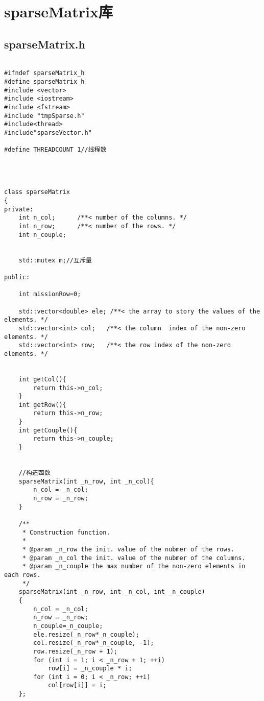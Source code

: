 \chapter{sparseMatrix库}

\section{sparseMatrix.h}
\begin{lstlisting}

#ifndef sparseMatrix_h
#define sparseMatrix_h
#include <vector>
#include <iostream>
#include <fstream>
#include "tmpSparse.h"
#include<thread>
#include"sparseVector.h"

#define THREADCOUNT 1//线程数




class sparseMatrix
{
private:
    int n_col;		/**< number of the columns. */
    int n_row;		/**< number of the rows. */
    int n_couple;
    
    
    std::mutex m;//互斥量
    
public:
    
    int missionRow=0;
    
    std::vector<double> ele; /**< the array to story the values of the elements. */
    std::vector<int> col;	/**< the column  index of the non-zero elements. */
    std::vector<int> row;	/**< the row index of the non-zero elements. */
    
    
    int getCol(){
        return this->n_col;
    }
    int getRow(){
        return this->n_row;
    }
    int getCouple(){
        return this->n_couple;
    }
    
    
    //构造函数
    sparseMatrix(int _n_row, int _n_col){
        n_col = _n_col;
        n_row = _n_row;
    }
    
    /**
     * Construction function.
     *
     * @param _n_row the init. value of the nubmer of the rows.
     * @param _n_col the init. value of the nubmer of the columns.
     * @param _n_couple the max number of the non-zero elements in each rows.
     */
    sparseMatrix(int _n_row, int _n_col, int _n_couple)
    {
        n_col = _n_col;
        n_row = _n_row;
        n_couple=_n_couple;
        ele.resize(_n_row*_n_couple);
        col.resize(_n_row*_n_couple, -1);
        row.resize(_n_row + 1);
        for (int i = 1; i < _n_row + 1; ++i)
            row[i] = _n_couple * i;
        for (int i = 0; i < _n_row; ++i)
            col[row[i]] = i;
    };
    

\end{lstlisting}
